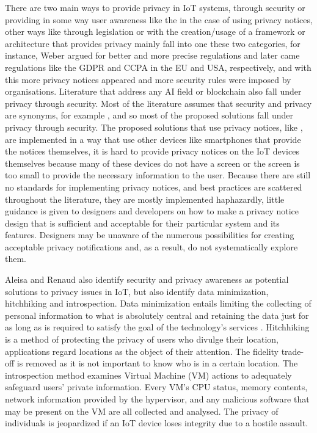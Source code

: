 There are two main ways to provide privacy in IoT systems, through security
or providing in some way user awareness like the in the case of using privacy
notices, other ways like through legislation or with the
creation/usage of a framework or architecture that provides privacy mainly
fall into one these two categories, for instance, Weber \cite{WEBER2015618} argued
for better and more precise regulations and later came regulations like the GDPR and CCPA in
the EU and USA, respectively, and with this more privacy notices appeared and
more security rules were imposed by organisations. Literature that address
any AI field \cite{zhao2020local, AntunesFederated, zhang2017privacy} or
blockchain \cite{AliIoT} also fall under privacy through security.
Most of the literature assumes that security and privacy are
synonyms, for example \cite{opara2022framework, FabianoInternet, SunSecure},
and so most of the proposed solutions fall under privacy through security.
The proposed solutions that use privacy notices, like \cite{FengDesign},
are implemented in a way that use other devices like smartphones that provide
the notices themselves, it is hard to provide privacy notices on the IoT
devices themselves because many of these devices do not have a screen or
the screen is too small to provide the necessary information to the user.
Because there are still no standards for implementing privacy notices, and
best practices are scattered throughout the literature, they are mostly
implemented haphazardly, little guidance is given to designers and developers
on how to make a privacy notice design that is sufficient and acceptable
for their particular system and its features. Designers may be unaware of
the numerous possibilities for creating acceptable privacy notifications
and, as a result, do not systematically explore them.

Aleisa and Renaud \cite{aleisa2016privacy} also identify security and privacy
awareness as potential solutions to privacy issues in IoT, but also identify
data minimization, hitchhiking and introspection. Data minimization entails
limiting the collecting of personal information to what is absolutely central
and retaining the data just for as long as is required to satisfy the goal
of the technology's services \cite{ojDirective281}. Hitchhiking \cite{tang2006putting}
is a method of protecting the privacy of users who divulge their location,
applications regard locations as the object of their attention. The fidelity
trade-off is removed as it is not important to know who is in a certain
location. The introspection \cite{kang2015protection} method examines Virtual
Machine (VM) actions to adequately safeguard users' private information.
Every VM's CPU status, memory contents, network information provided by the
hypervisor, and any malicious software that may be present on the VM are
all collected and analysed. The privacy of individuals is jeopardized if
an IoT device loses integrity due to a hostile assault.

